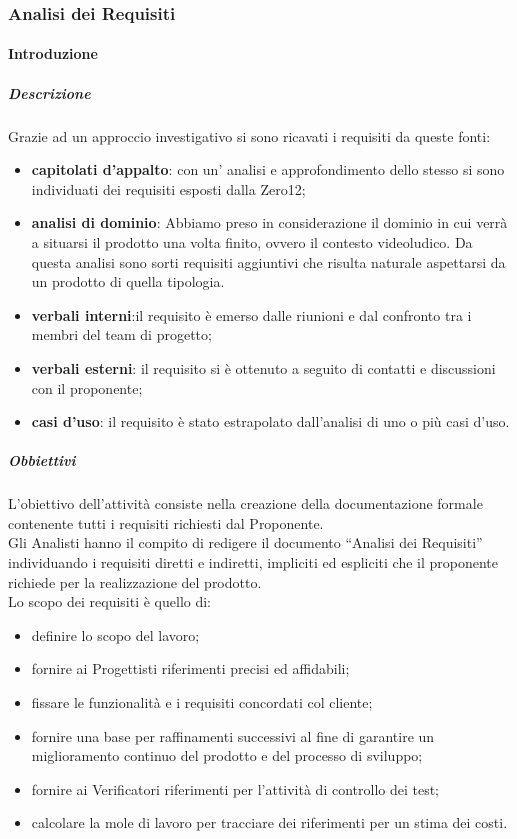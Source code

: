 		\subsubsection{Analisi dei Requisiti}
			\paragraph{Introduzione}
				\subparagraph{Descrizione}
					Grazie ad un approccio investigativo si sono ricavati i requisiti da queste fonti:\\
					\begin{itemize}
						\item\textbf{capitolati d’appalto}: con un’ analisi e approfondimento dello stesso si sono individuati dei requisiti esposti dalla Zero12;
						\item\textbf{analisi di dominio}: Abbiamo preso in considerazione il dominio in cui verrà a situarsi il prodotto una volta finito, ovvero il contesto videoludico. Da questa analisi sono sorti requisiti aggiuntivi che risulta naturale aspettarsi da un prodotto di quella tipologia.
						\item\textbf{verbali interni}:il requisito è emerso dalle riunioni e dal confronto tra i membri del team di progetto;
						\item\textbf{verbali esterni}: il requisito si è ottenuto a seguito di contatti e discussioni con il proponente;
						\item\textbf{casi d’uso}: il requisito è stato estrapolato dall'analisi di uno o più casi d’uso.
					\end{itemize}
				\subparagraph{Obbiettivi}
					L’obiettivo dell'attività consiste nella creazione della documentazione formale contenente tutti i requisiti richiesti dal Proponente.\\
					Gli Analisti hanno il compito di redigere il documento “Analisi dei Requisiti” individuando i requisiti diretti e indiretti, impliciti ed espliciti che il proponente richiede per la realizzazione del prodotto.\\
					Lo scopo dei requisiti è quello di:\\
					\begin{itemize}
						\item definire lo scopo del lavoro;
						\item fornire ai Progettisti riferimenti precisi ed affidabili;
						\item fissare le funzionalità e i requisiti concordati col cliente;
						\item fornire una base per raffinamenti successivi al fine di garantire un miglioramento continuo del prodotto e del processo di sviluppo;
						\item fornire ai Verificatori riferimenti per l'attività di controllo dei test;
						\item calcolare la mole di lavoro per tracciare dei riferimenti per un stima dei costi.
					\end{itemize}
